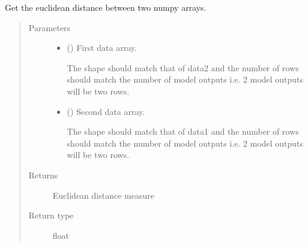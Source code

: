 \documentclass[letterpaper,10pt,english]{sphinxmanual}
\begin{document}

\begin{fulllineitems}
\label{\detokenize{abc:bayescmd.abc.distances.euclidean_dist}}
Get the euclidean distance between two numpy arrays.
\begin{quote}\begin{description}
\item[{Parameters}] \leavevmode\begin{itemize}
\item {} 
 () \textendash{} 
First data array.

The shape should match that of data2 and the number of rows should
match the number of model outputs i.e. 2 model outputs will be two
rows.


\item {} 
 () \textendash{} 
Second data array.

The shape should match that of data1 and the number of rows should
match the number of model outputs i.e. 2 model outputs will be two
rows.


\end{itemize}

\item[{Returns}] \leavevmode
{} \textendash{} Euclidean distance measure

\item[{Return type}] \leavevmode
float

\end{description}\end{quote}

\end{fulllineitems}

\end{document}
